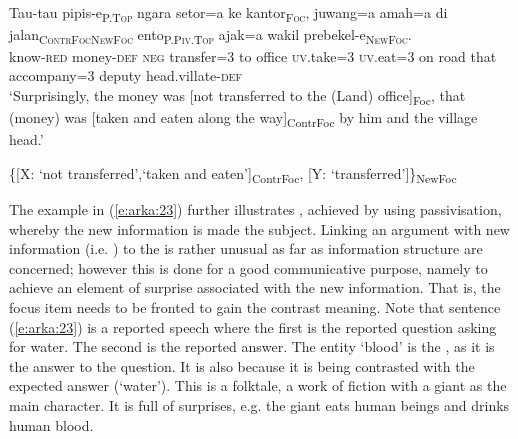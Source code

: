\documentclass[output=paper
,modfonts
,nonflat]{langsci/langscibook}
\begin{document}
\begin{exe}
	\label{e:arka:21}\\
	\gll Tau-tau    {\ob}pipis-e{\cb}\textsc{\textsubscript{P.Top}}  {\ob}ngara  setor=a   ke   kantor{\cb}\textsc{\textsubscript{Foc}}, {\ob}{\ob}juwang=a   amah=a   di jalan{\cb}\textsc{\textsubscript{ContrFoc}}{\cb}\textsc{\textsubscript{NewFoc}}   {\ob}ento{\cb}\textsc{\textsubscript{P.Piv.Top}} {\ob}ajak=a     wakil   prebekel-e{\cb}\textsc{\textsubscript{NewFoc}}.\\
	know-\textsc{red}   \phantom{[}money-\textsc{def}   \phantom{[}\textsc{neg}   transfer=3  to   office  \phantom{[[}\textsc{uv}.take=3   \textsc{uv}.eat=3  on   road  \phantom{[}that  \phantom{[}accompany=3    deputy  head.villate-\textsc{def}\\
	\glt ‘Surprisingly, the money was [not transferred to the (Land) office]\textsubscript{Foc},  that (money) was [taken and eaten along the way]\textsubscript{ContrFoc} by him and the village head.’
\end{exe}

\begin{exe}
	\ex\label{e:arka:22}\{[X: ‘not transferred’,‘taken and eaten’]\textsubscript{ContrFoc}, [Y: ‘transferred’]\}\textsubscript{NewFoc}
\end{exe}

\noindent
The example in (\ref{e:arka:23}) further illustrates , achieved by using passivisation, whereby the new information is made the subject. Linking an argument with new information (i.e. ) to the  is rather unusual as far as information structure are concerned; however this is done for a good communicative purpose, namely to achieve an element of surprise associated with the new information. That is, the focus item needs to be fronted to gain the contrast meaning. Note that sentence (\ref{e:arka:23}) is a reported speech where the first  is the reported question asking for water. The second  is the reported answer. The entity ‘blood’ is the , as it is the answer to the question. It is also  because it is being contrasted with the expected answer (‘water’). This is a folktale, a work of fiction with a giant as the main character. It is full of surprises, e.g. the giant eats human beings and drinks human blood.  
\end{document}
